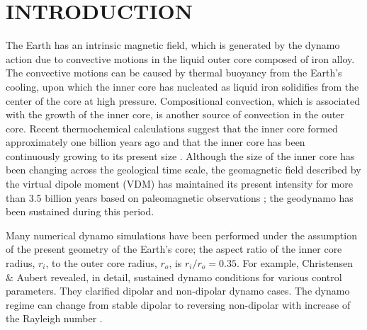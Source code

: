 \section{INTRODUCTION}
{\color{red} %
The Earth has an intrinsic magnetic field, which is generated by the dynamo action due to convective motions in the liquid outer core composed of iron alloy.
}
{\color{red} %
The convective motions can be caused by thermal buoyancy from the Earth's cooling, upon which the inner core has nucleated as liquid iron solidifies from the center of the core at high pressure.
}
{\color{red} %
Compositional convection, which is associated with the growth of the inner core, is another source of convection in the outer core.
}
Recent thermochemical calculations suggest that the inner core formed approximately one billion years ago and that the inner core has been continuously growing to its present size \cite{Labrosse:2001}.
Although the size of the inner core has been changing across the geological time scale, the geomagnetic field described by the virtual dipole moment (VDM) has maintained its present intensity for more than 3.5 billion years based on paleomagnetic observations \cite{Biggin:2015}; the geodynamo has been sustained during this period.

{\color{red}
Many numerical dynamo simulations have been performed under the assumption of the present geometry of the Earth’s core; the aspect ratio of the inner core radius, $r_{i}$, to the outer core radius, $r_{o}$, is $r_{i} / r_{o} = 0.35$.
}
For example, Christensen \& Aubert  revealed, in detail, sustained dynamo conditions for various control parameters. 
They clarified dipolar and non-dipolar dynamo cases.
The dynamo regime can change from stable dipolar to reversing non-dipolar with increase of the Rayleigh number \cite{Kutzner:2002,Olson:2011}.

